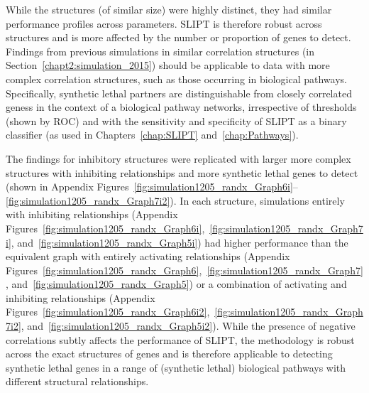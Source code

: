 While the  structures (of similar size) were highly distinct, they had similar performance profiles across parameters. \gls{SLIPT} is therefore robust across  structures and is more affected by the number or proportion of genes to detect. Findings from previous simulations in similar correlation structures (in Section~\ref{chapt2:simulation_2015}) should be applicable to  data with more complex correlation structures, such as those occurring in biological pathways. Specifically, \gls{synthetic lethal} partners are distinguishable from closely correlated geness in the context of a biological pathway networks, irrespective of thresholds (shown by \gls{ROC}) and with the sensitivity and specificity of \gls{SLIPT} as a binary classifier (as used in Chapters~\ref{chap:SLIPT} and~\ref{chap:Pathways}).



The findings for inhibitory  structures were replicated with larger more complex  structures with inhibiting relationships and more \gls{synthetic lethal} genes to detect (shown in Appendix Figures~\ref{fig:simulation1205_randx_Graph6i}\nobreakdash--\ref{fig:simulation1205_randx_Graph7i2}). In each  structure, simulations entirely with inhibiting relationships (Appendix Figures~\ref{fig:simulation1205_randx_Graph6i},~\ref{fig:simulation1205_randx_Graph7i}, and~\ref{fig:simulation1205_randx_Graph5i}) had higher performance than the equivalent graph with entirely activating relationships (Appendix Figures~\ref{fig:simulation1205_randx_Graph6},~\ref{fig:simulation1205_randx_Graph7}, and~\ref{fig:simulation1205_randx_Graph5}) or a combination of activating and inhibiting relationships (Appendix Figures~\ref{fig:simulation1205_randx_Graph6i2},~\ref{fig:simulation1205_randx_Graph7i2}, and~\ref{fig:simulation1205_randx_Graph5i2}). 
While the presence of negative correlations subtly affects the performance of \gls{SLIPT}, the methodology is robust across the exact structures of genes and is therefore applicable to detecting \gls{synthetic lethal} genes in a range of (synthetic lethal) biological pathways with different structural relationships.

